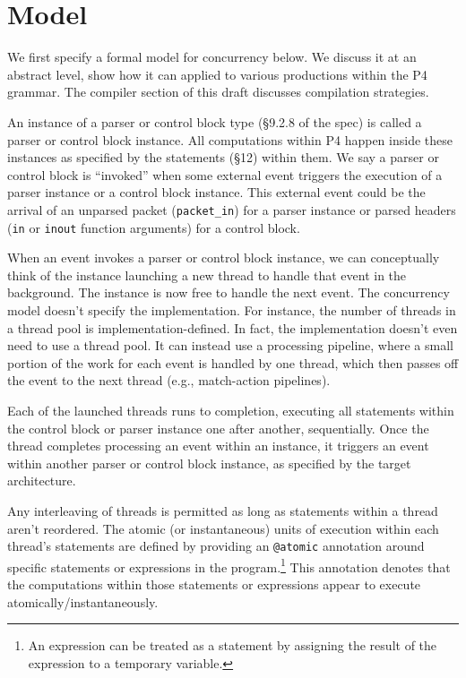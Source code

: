 \section{Model}

We first specify a formal model for concurrency below. We discuss it at an
abstract level, show how it can applied to various productions within the P4
grammar. The compiler section of this draft discusses compilation strategies.

An instance of a parser or control block type (\S9.2.8 of the spec) is called a
parser or control block instance.  All computations within P4 happen inside
these instances as specified by the statements (\S12) within them.  We say a
parser or control block is ``invoked'' when some external event triggers the
execution of a parser instance or a control block instance.  This external
event could be the arrival of an unparsed packet (\texttt{packet\_in}) for a
parser instance or parsed headers (\texttt{in} or \texttt{inout} function
arguments) for a control block.

When an event invokes a parser or control block instance, we can conceptually
think of the instance launching a new thread to handle that event in the
background.  The instance is now free to handle the next event. The concurrency
model doesn't specify the implementation. For instance, the number of threads
in a thread pool is implementation-defined.  In fact, the implementation
doesn't even need to use a thread pool. It can instead use a processing
pipeline, where a small portion of the work for each event is handled by one
thread, which then passes off the event to the next thread (e.g., match-action
pipelines).

Each of the launched threads runs to completion, executing all statements
within the control block or parser instance one after another, sequentially.
Once the thread completes processing an event within an instance, it triggers
an event within another parser or control block instance, as specified by the
target architecture.

Any interleaving of threads is permitted as long as statements within a thread
aren't reordered. The atomic (or instantaneous) units of execution within each
thread's statements are defined by providing an \texttt{@atomic} annotation
around specific statements or expressions in the program.\footnote{An
expression can be treated as a statement by assigning the result of the
expression to a temporary variable.} This annotation denotes that the
computations within those statements or expressions appear to execute
atomically/instantaneously.

